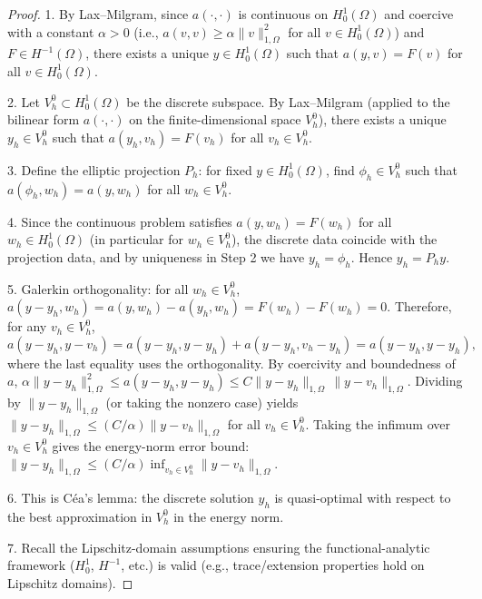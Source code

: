 \begin{proof}
1. By Lax--Milgram, since $a(\cdot,\cdot)$ is continuous on $H^1_0(\Omega)$ and coercive with a constant $\alpha>0$ (i.e., $a(v,v) \ge \alpha \|v\|_{1,\Omega}^2$ for all $v\in H^1_0(\Omega)$) and $F\in H^{-1}(\Omega)$, there exists a unique $y\in H^1_0(\Omega)$ such that $a(y,v)=F(v)$ for all $v\in H^1_0(\Omega)$.

2. Let $V^0_h\subset H^1_0(\Omega)$ be the discrete subspace. By Lax--Milgram (applied to the bilinear form $a(\cdot,\cdot)$ on the finite-dimensional space $V^0_h$), there exists a unique $y_h\in V^0_h$ such that $a(y_h,v_h)=F(v_h)$ for all $v_h\in V^0_h$.

3. Define the elliptic projection $P_h$: for fixed $y\in H^1_0(\Omega)$, find $\phi_h\in V^0_h$ such that $a(\phi_h,w_h)=a(y,w_h)$ for all $w_h\in V^0_h$.

4. Since the continuous problem satisfies $a(y,w_h)=F(w_h)$ for all $w_h\in H^1_0(\Omega)$ (in particular for $w_h\in V^0_h$), the discrete data coincide with the projection data, and by uniqueness in Step 2 we have $y_h=\phi_h$. Hence $y_h = P_h y$.

5. Galerkin orthogonality: for all $w_h\in V^0_h$, $a(y-y_h,w_h)=a(y,w_h)-a(y_h,w_h)=F(w_h)-F(w_h)=0$. Therefore, for any $v_h\in V^0_h$,
   \[
   a(y-y_h,y-v_h)=a(y-y_h,y-y_h)+a(y-y_h,v_h-y_h)=a(y-y_h,y-y_h),
   \]
   where the last equality uses the orthogonality. By coercivity and boundedness of $a$, $\alpha\|y-y_h\|_{1,\Omega}^2 \le a(y-y_h,y-y_h) \le C\|y-y_h\|_{1,\Omega}\,\|y-v_h\|_{1,\Omega}$.
   Dividing by $\|y-y_h\|_{1,\Omega}$ (or taking the nonzero case) yields $\|y-y_h\|_{1,\Omega} \le (C/\alpha) \|y-v_h\|_{1,\Omega}$ for all $v_h\in V^0_h$.
   Taking the infimum over $v_h\in V^0_h$ gives the energy-norm error bound: $\|y-y_h\|_{1,\Omega} \le (C/\alpha) \inf_{v_h\in V^0_h} \|y-v_h\|_{1,\Omega}$.

6. This is Céa’s lemma: the discrete solution $y_h$ is quasi-optimal with respect to the best approximation in $V^0_h$ in the energy norm.

7. Recall the Lipschitz-domain assumptions ensuring the functional-analytic framework ($H^1_0$, $H^{-1}$, etc.) is valid (e.g., trace/extension properties hold on Lipschitz domains).
\end{proof}
